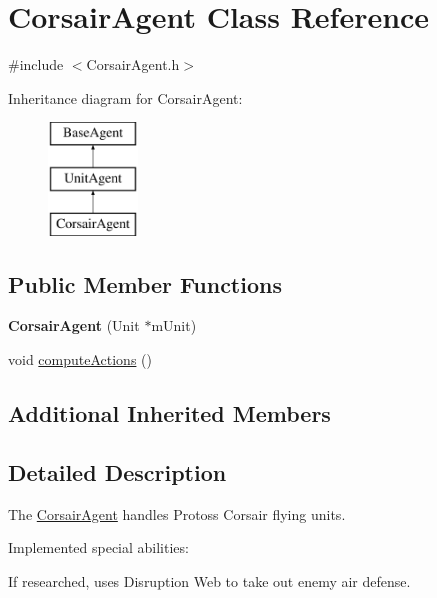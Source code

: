 \hypertarget{class_corsair_agent}{\section{Corsair\-Agent Class Reference}
\label{class_corsair_agent}
}


{\ttfamily \#include $<$Corsair\-Agent.\-h$>$}

Inheritance diagram for Corsair\-Agent\-:\begin{figure}[H]
\begin{center}
\leavevmode
\includegraphics[height=3.000000cm]{class_corsair_agent}
\end{center}
\end{figure}
\subsection*{Public Member Functions}
\begin{DoxyCompactItemize}
\item 
\hypertarget{class_corsair_agent_afbc930e0bbaa40475a5d107558dc47d6}{{\bfseries Corsair\-Agent} (Unit $\ast$m\-Unit)}\label{class_corsair_agent_afbc930e0bbaa40475a5d107558dc47d6}

\item 
void \hyperlink{class_corsair_agent_a8e90c5ceefaeb8090943b0c673679603}{compute\-Actions} ()
\end{DoxyCompactItemize}
\subsection*{Additional Inherited Members}


\subsection{Detailed Description}
The \hyperlink{class_corsair_agent}{Corsair\-Agent} handles Protoss Corsair flying units.

Implemented special abilities\-:
\begin{DoxyItemize}
\item If researched, uses Disruption Web to take out enemy air defense.
\end{DoxyItemize}

